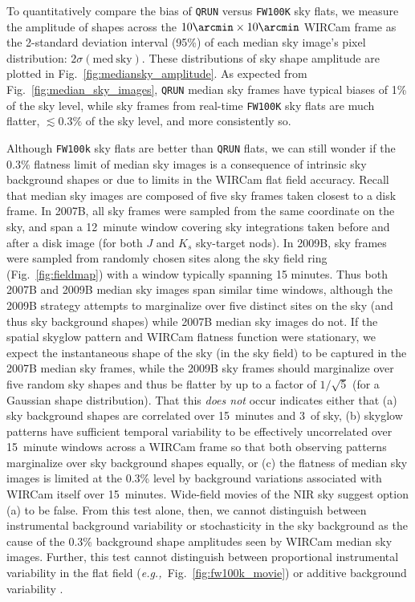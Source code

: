 \documentclass[iop]{emulateapj}
\newcommand{\eg}{\textit{e.g.,~}}
\newcommand{\Fig}[1]{Fig.~\ref{fig:#1}}  %
\begin{document}
To quantitatively compare the bias of \texttt{QRUN} versus \texttt{FW100K} sky flats, we measure the amplitude of shapes across the $10\arcmin \times 10\arcmin$ WIRCam frame as the 2-standard deviation interval (95\%) of each median sky image's pixel distribution: $2 \sigma(\mathrm{med~sky})$.
These distributions of sky shape amplitude are plotted in \Fig{mediansky_amplitude}.
As expected from \Fig{median_sky_images}, \texttt{QRUN} median sky frames have typical biases of 1\% of the sky level, while sky frames from real-time \texttt{FW100K} sky flats are much flatter, $\lesssim 0.3\%$ of the sky level, and more consistently so.

Although \texttt{FW100k} sky flats are better than \texttt{QRUN} flats, we can still wonder if the 0.3\% flatness limit of median sky images is a consequence of intrinsic sky background shapes or due to limits in the WIRCam flat field accuracy.
Recall that median sky images are composed of five sky frames taken closest to a disk frame.
In 2007B, all sky frames were sampled from the same coordinate on the sky, and span a 12~minute window covering sky integrations taken before and after a disk image (for both $J$ and $K_s$ sky-target nods).
In 2009B, sky frames were sampled from randomly chosen sites along the sky field ring (\Fig{fieldmap}) with a window typically spanning 15 minutes.
Thus both 2007B and 2009B median sky images span similar time windows, although the 2009B strategy attempts to marginalize over five distinct sites  on the sky (and thus sky background shapes) while 2007B median sky images do not.
If the spatial skyglow pattern and WIRCam flatness function were stationary, we expect the instantaneous shape of the sky (in the sky field) to be captured in the 2007B median sky frames, while the 2009B sky frames should marginalize over five random sky shapes and thus be flatter by up to a factor of $1/\sqrt{5}$ (for a Gaussian shape distribution).
That this \emph{does not} occur indicates either that (a) sky background shapes are correlated over 15~minutes and 3\arcdeg\ of sky, (b) skyglow patterns have sufficient temporal variability to be effectively uncorrelated over 15~minute windows across a WIRCam frame so that both observing patterns marginalize over sky background shapes equally, or (c) the flatness of median sky images is limited at the 0.3\% level by background variations associated with WIRCam itself over 15~minutes.
Wide-field movies of the NIR sky \citep{Adams:1996} suggest option (a) to be false.
From this test alone, then, we cannot distinguish between instrumental background variability or stochasticity in the sky background as the cause of the 0.3\% background shape amplitudes seen by WIRCam median sky images.
Further, this test cannot distinguish between proportional instrumental variability in the flat field (\eg \Fig{fw100k_movie}) or additive background variability \citep[as seen in the CFHT-IR camera,][]{Vaduvescu:2004}.
\end{document}
